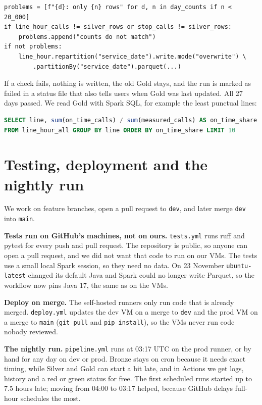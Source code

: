 \documentclass[11pt,a4paper]{article}
\newcommand{\code}[1]{\texttt{#1}}
\begin{document}
\begin{lstlisting}
problems = [f"{d}: only {n} rows" for d, n in day_counts if n < 20_000]
if line_hour_calls != silver_rows or stop_calls != silver_rows:
    problems.append("counts do not match")
if not problems:
    line_hour.repartition("service_date").write.mode("overwrite") \
        .partitionBy("service_date").parquet(...)
\end{lstlisting}

If a check fails, nothing is written, the old Gold stays, and the run is marked as failed in a
status file that also tells users when Gold was last updated. All 27 days passed. We read Gold
with Spark SQL, for example the least punctual lines:

\begin{lstlisting}[language=SQL]
SELECT line, sum(on_time_calls) / sum(measured_calls) AS on_time_share
FROM line_hour_all GROUP BY line ORDER BY on_time_share LIMIT 10
\end{lstlisting}

\section{Testing, deployment and the nightly run}
\label{sec:lifecycle}

We work on feature branches, open a pull request to \code{dev}, and later merge \code{dev}
into \code{main}.

\textbf{Tests run on GitHub's machines, not on ours.} \code{tests.yml} runs ruff and pytest
for every push and pull request. The repository is public, so anyone can open a pull request,
and we did not want that code to run on our VMs. The tests use a small local Spark session,
so they need no data. On 23 November \code{ubuntu-latest} changed its default Java and Spark
could no longer write Parquet, so the workflow now pins Java 17, the same as on the VMs.

\textbf{Deploy on merge.} The self-hosted runners only run code that is already merged.
\code{deploy.yml} updates the dev VM on a merge to \code{dev} and the prod VM on a merge to
\code{main} (\code{git pull} and \code{pip install}), so the VMs never run code nobody reviewed.

\textbf{The nightly run.} \code{pipeline.yml} runs at 03:17 UTC on the prod runner, or by hand
for any day on dev or prod. Bronze stays on cron because it needs exact timing, while Silver
and Gold can start a bit late, and in Actions we get logs, history and a red or green status
for free. The first scheduled runs started up to 7.5 hours late; moving from 04:00 to 03:17
helped, because GitHub delays full-hour schedules the most.
\end{document}
